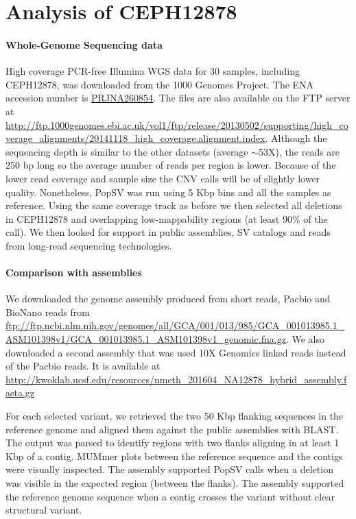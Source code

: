 \section*{Analysis of CEPH12878}

\paragraph{Whole-Genome Sequencing data}
High coverage PCR-free Illumina WGS data for 30 samples, including CEPH12878, was downloaded from the 1000 Genomes Project\cite{Sudmant2015a}.
The ENA accession number is \href{http://www.ebi.ac.uk/ena/data/view/PRJNA260854}{PRJNA260854}.
The files are also available on the FTP server at \url{http://ftp.1000genomes.ebi.ac.uk/vol1/ftp/release/20130502/supporting/high_coverage_alignments/20141118_high_coverage.alignment.index}.
Although the sequencing depth is similar to the other datasets (average $\sim$53X), the reads are 250 bp long so the average number of reads per region is lower.
Because of the lower read coverage and sample size the CNV calls will be of slightly lower quality.
Nonetheless, {\sf PopSV} was run using 5 Kbp bins and all the samples as reference.
Using the same coverage track as before we then selected all deletions in CEPH12878 and overlapping low-mappability regions (at least 90\% of the call).
We then looked for support in public assemblies, SV catalogs and reads from long-read sequencing technologies.

\paragraph{Comparison with assemblies}
We downloaded the genome assembly produced from short reads, Pacbio and BioNano reads\cite{Pendleton2015} from \url{ftp://ftp.ncbi.nlm.nih.gov/genomes/all/GCA/001/013/985/GCA_001013985.1_ASM101398v1/GCA_001013985.1_ASM101398v1_genomic.fna.gz}.
We also downloaded a second assembly that was used 10X Genomics linked reads instead of the Pacbio reads\cite{Mostovoy2016}.
It is available at \url{http://kwoklab.ucsf.edu/resources/nmeth_201604_NA12878_hybrid_assembly.fasta.gz}

For each selected variant, we retrieved the two 50 Kbp flanking sequences in the reference genome and aligned them against the public assemblies with {\sf BLAST}\cite{Camacho2009}.
The output was parsed to identify regions with two flanks aligning in at least 1 Kbp of a contig.
MUMmer plots\cite{Kurtz2004} between the reference sequence and the contigs were visually inspected.
The assembly supported {\sf PopSV} calls when a deletion was visible in the expected region (between the flanks).
The assembly supported the reference genome sequence when a contig crosses the variant without clear structural variant.

